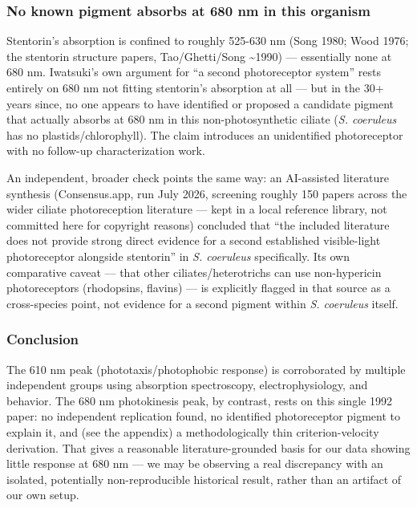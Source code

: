 \documentclass[
]{article}
\begin{document}
\hypertarget{no-known-pigment-absorbs-at-680-nm-in-this-organism}{%
\subsubsection{No known pigment absorbs at 680 nm in this
organism}\label{no-known-pigment-absorbs-at-680-nm-in-this-organism}}

Stentorin's absorption is confined to roughly 525-630 nm (Song 1980;
Wood 1976; the stentorin structure papers, Tao/Ghetti/Song
\textasciitilde1990) --- essentially none at 680 nm. Iwatsuki's own
argument for ``a second photoreceptor system'' rests entirely on 680 nm
not fitting stentorin's absorption at all --- but in the 30+ years
since, no one appears to have identified or proposed a candidate pigment
that actually absorbs at 680 nm in this non-photosynthetic ciliate
(\emph{S. coeruleus} has no plastids/chlorophyll). The claim introduces
an unidentified photoreceptor with no follow-up characterization work.

An independent, broader check points the same way: an AI-assisted
literature synthesis (Consensus.app, run July 2026, screening roughly
150 papers across the wider ciliate photoreception literature --- kept
in a local reference library, not committed here for copyright reasons)
concluded that ``the included literature does not provide strong direct
evidence for a second established visible-light photoreceptor alongside
stentorin'' in \emph{S. coeruleus} specifically. Its own comparative
caveat --- that other ciliates/heterotrichs can use non-hypericin
photoreceptors (rhodopsins, flavins) --- is explicitly flagged in that
source as a cross-species point, not evidence for a second pigment
within \emph{S. coeruleus} itself.

\hypertarget{conclusion}{%
\subsubsection{Conclusion}\label{conclusion}}

The 610 nm peak (phototaxis/photophobic response) is corroborated by
multiple independent groups using absorption spectroscopy,
electrophysiology, and behavior. The 680 nm photokinesis peak, by
contrast, rests on this single 1992 paper: no independent replication
found, no identified photoreceptor pigment to explain it, and (see the
appendix) a methodologically thin criterion-velocity derivation. That
gives a reasonable literature-grounded basis for our data showing little
response at 680 nm --- we may be observing a real discrepancy with an
isolated, potentially non-reproducible historical result, rather than an
artifact of our own setup.
\end{document}

